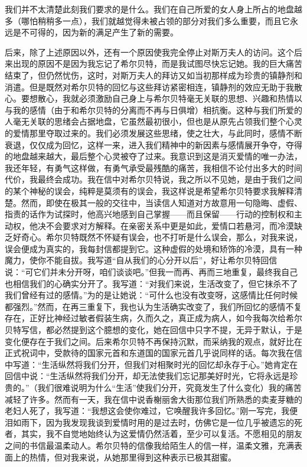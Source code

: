 我们并不太清楚此刻我们要求的是什么。我们在自己所爱的女人身上所占的地盘越多（哪怕稍稍多一点），我们就越觉得未被占领的部分对我们多么重要，而且它永远是不可得的，因为新的满足产生了新的需要。
\par 后来，除了上述原因以外，还有一个原因使我完全停止对斯万夫人的访问。这个后来出现的原因不是因为我忘记了希尔贝特，而是我试图尽快忘记她。我的巨大痛苦结束了，但仍然忧伤，这时，对斯万夫人的拜访又如当初那样成为珍贵的镇静剂和消遣。但是既然对希尔贝特的回忆与这些拜访紧密相连，镇静剂的效应无助于我散心。要想散心，我就必须激励自己身上与希尔贝特毫无关联的思想、兴趣和热情以与我的感情（由于和希尔贝特的分离而不再与日俱增）相抗衡。这种与我们所爱的人毫无关联的思绪会占据地盘，它虽然最初很小，但也是从原先占领我们整个心灵的爱情那里夺取过来的。我们必须发展这些思绪，使之壮大，与此同时，感情不断衰退，仅仅成为回忆，这样一来，进入我们精神中的新因素与感情展开争夺，夺得的地盘越来越大，最后整个心灵被夺了过来。我意识到这是消灭爱情的唯一办法，我还年轻，有勇气这样做，有勇气承受最残酷的痛苦，我相信不论付出多大的时间代价，我最终会成功。我在信中对希尔贝特说，我之所以不见她，是由于我们之间的某个神秘的误会，纯粹是莫须有的误会，我这样说是希望希尔贝特要求我解释清楚。然而，即使在极其一般的交往中，当读信人知道对方故意用一句隐晦、虚假、指责的话作为试探时，他高兴地感到自己掌握——而且保留——行动的控制权和主动权，他决不会要求对方解释。在亲密关系中更是如此，爱情口若悬河，而冷漠缺乏好奇心。希尔贝特既然不怀疑有误会，也不打听是什么误会，那么，对我来说，误会便成为真实的，我每封信都提到它。这种虚假的处境和矫饰的冷漠，具有一种魔力，使你不能自拔。我写道“自从我们的心分开以后”，好让希尔贝特回信说：“可它们并未分开呀，咱们谈谈吧。”但我一而再、再而三地重复，最终我自己也相信我们的心确实分开了。我写道：“对我们来说，生活改变了，但它抹杀不了我们曾经有过的感情。”为的是让她说：“可什么也没有改变呀，这感情比任何时候都强烈。”然而，在再三重复下，我也认为生活确实改变了，我们所回忆的感情不复存在，正好比神经过敏者假装生病，久而久之，真正成为病人，如今我每次给希尔贝特写信，都必然提到这个臆想的变化，她在回信中只字不提，无异于默认，于是变化便存在于我们之间。后来希尔贝特不再保持沉默，而采纳我的观点，就好比在正式祝词中，受款待的国家元首和东道国的国家元首几乎说同样的话。每次我在信中写道：“生活纵然将我们分开，但我们对相聚时光的回忆却永存于心。”她肯定在回信中说：“生活纵然将我们分开，却无法使我们忘记那美好时光，它将永远是珍贵的。”（我们很难说明为什么“生活”使我们分开，究竟发生了什么变化）我的痛苦减轻了许多。然而有一天，我在信中说香榭丽舍大街那位我们所熟悉的卖麦芽糖的老妇人死了，我写道：“我想这会使你难过，它唤醒我许多回忆。”刚一写完，我便泪如雨下，因为我发现我谈到爱情时用的是过去时，仿佛它是一位几乎被遗忘的死者，其实，我不自觉地始终认为这爱情仍然活着，至少可以复活。不愿相见的朋友之间的书信最温柔动人。希尔贝特的信像我给陌生人的信一样，温柔文雅，充满表面上的热情，但对我来说，从她那里得到这种表示已极其甜蜜。
